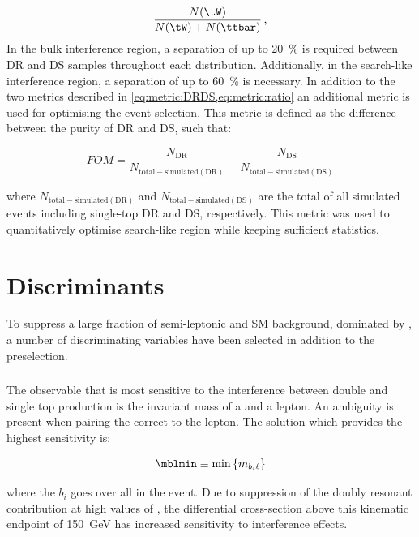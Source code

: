 \begin{equation}
  \dfrac{N(\tW)}{N(\tW) + N(\ttbar)}\,,
  \label{eq:metric:ratio}
\end{equation}
In the bulk interference region, a separation of up to \qty{20}{\%} is required between DR and DS samples throughout each distribution.
Additionally, in the search-like interference region, a separation of up to \qty{60}{\%} is necessary.
In addition to the two metrics described in \cref{eq:metric:DRDS,eq:metric:ratio} an additional metric is used for optimising the event selection.
This metric is defined as the difference between the purity of DR and DS,
such that:

\begin{equation}
  FOM = \dfrac{N_\mathrm{DR}}{N_\mathrm{total-simulated(DR)}} - \dfrac{N_\mathrm{DS}}{N_\mathrm{total-simulated(DS)}}
  \label{eq:PurityofDRDS}
\end{equation}

where \(N_\mathrm{total-simulated(DR)}\) and \(N_\mathrm{total-simulated(DS)}\) 
are the total of all simulated events including single-top DR and DS, respectively.  %
This metric was used to quantitatively optimise search-like region while keeping sufficient statistics.


\section{Discriminants}
To suppress a large fraction of semi-leptonic \ttbar and SM background,
dominated by \Wjets, a number of discriminating variables have been
selected in addition to the preselection.

\subsubsection{\texorpdfstring{\mblmin}{Minimum invariant mass of a lepton and a b-jet}}
The observable that is most sensitive to the interference
between double and single top production is the invariant mass of
a \bjet and a lepton. An ambiguity is present when pairing the correct
\bjet to the lepton. The solution which provides
the highest sensitivity is:

\begin{equation}
  \mblmin \equiv \min \left\{ m_{b_i \ell} \right\}  %
  \label{eq:mblmin}
\end{equation}

where the \(b_i\) goes over all \bjets in the event.
Due to suppression of the doubly resonant contribution at high values
of \mblmin, the differential cross-section above this kinematic endpoint
of \qty{150}{\GeV} has increased sensitivity to interference effects.

